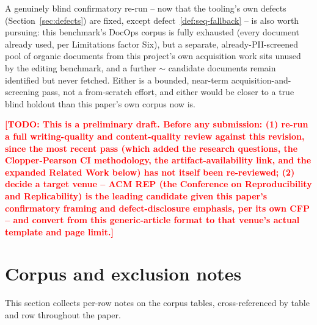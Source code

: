 \documentclass[11pt]{article}
\DeclareRobustCommand{\claim}[2]{#2}
\newcommand{\todo}[1]{\textcolor{red}{\textbf{[TODO: #1]}}}
\begin{document}
A genuinely blind confirmatory re-run -- \claim{defects-all-fixed-status}{now that the tooling's own defects (Section~\ref{sec:defects})
are fixed, except defect~\ref{def:seq-fallback}} -- is also worth pursuing: \claim{licensed-docops-corpus}{this benchmark's
DocOps corpus is fully exhausted (every document already used, per Limitations factor Six),} but a
separate, already-PII-screened pool of  organic documents from this project's own acquisition
work sits unused by the editing benchmark, and a further $\sim$ candidate documents remain
identified but never fetched. Either is a bounded, near-term acquisition-and-screening pass, not
a from-scratch effort, and \claim{primary-corpus-holdout-status}{either would be closer to a true blind holdout than this paper's own
corpus now is.}

\todo{This is a preliminary draft. Before any submission: (1) re-run a full writing-quality and
content-quality review against this revision, since the most recent pass (which added the
research questions, the Clopper-Pearson CI methodology, the artifact-availability link, and the
expanded Related Work below) has not itself been re-reviewed; (2) decide a target venue --
ACM REP (the Conference on Reproducibility and Replicability) is the leading candidate given
this paper's confirmatory framing and defect-disclosure emphasis, per its own CFP -- and convert
from this generic-article format to that venue's actual template and page limit.}




\appendix
\section{Corpus and exclusion notes}
\label{app:notes}
This section collects per-row notes on the corpus tables, cross-referenced by table and row
throughout the paper.
\end{document}
